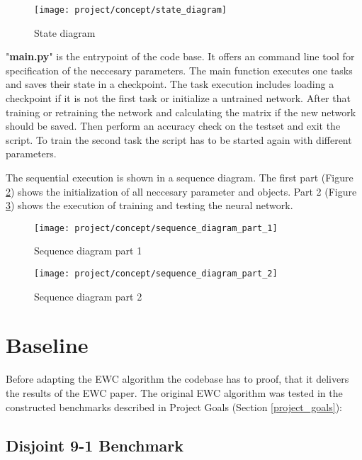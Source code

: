 \begin{figure}[H]
    \centering
    \texttt{[image: project/concept/state\_diagram]}
    \caption{State diagram}
    \label{fig:concept_state_diagram}
\end{figure}

"\textbf{main.py}" is the entrypoint of the code base.
It offers an command line tool for specification of the neccesary parameters.
\newline
The main function executes one tasks and saves their state in a checkpoint.
The task execution includes loading a checkpoint if it is not the first task or initialize a untrained network.
After that training or retraining the network and calculating the matrix if the new network should be saved.
Then perform an accuracy check on the testset and exit the script.
To train the second task the script has to be started again with different parameters.

The sequential execution is shown in a sequence diagram.
The first part (Figure \ref{fig:concept_sequence_diagram_part_1}) shows the initialization of all neccesary parameter and objects.
Part 2 (Figure \ref{fig:concept_sequence_diagram_part_2}) shows the execution of training and testing the neural network.

\begin{figure}[H]
    \centering
    \texttt{[image: project/concept/sequence\_diagram\_part\_1]}
    \caption{Sequence diagram part 1}
    \label{fig:concept_sequence_diagram_part_1}
\end{figure}

\begin{figure}[H]
    \centering
    \texttt{[image: project/concept/sequence\_diagram\_part\_2]}
    \caption{Sequence diagram part 2}
    \label{fig:concept_sequence_diagram_part_2}
\end{figure}

\newpage
\section{Baseline}

Before adapting the EWC algorithm the codebase has to proof, that it delivers the results of the EWC paper.
The original EWC algorithm was tested in the constructed benchmarks described in Project Goals (Section \ref{project_goals}):

\subsection{Disjoint 9-1 Benchmark}

